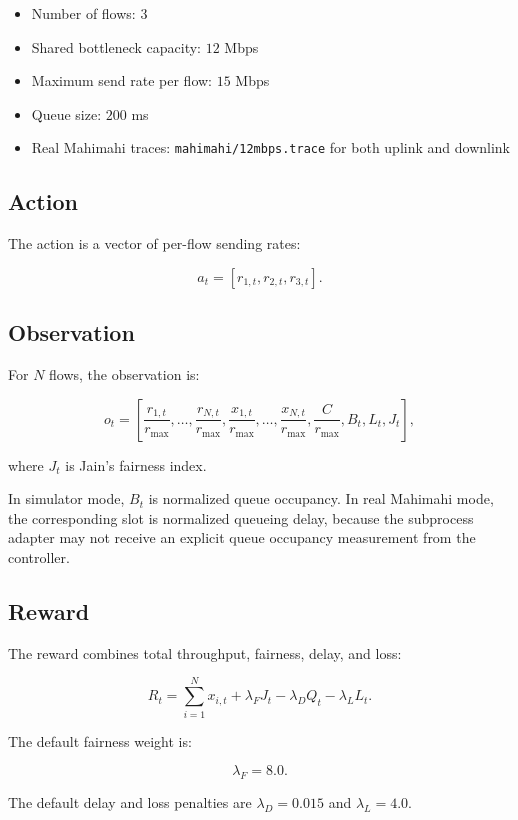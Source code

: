 \documentclass[11pt]{article}
\begin{document}
\begin{itemize}
  \item Number of flows: \(3\)
  \item Shared bottleneck capacity: \(12\) Mbps
  \item Maximum send rate per flow: \(15\) Mbps
  \item Queue size: \(200\) ms
  \item Real Mahimahi traces: \texttt{mahimahi/12mbps.trace} for both uplink
        and downlink
\end{itemize}

\subsection{Action}

The action is a vector of per-flow sending rates:

\[
a_t = [r_{1,t}, r_{2,t}, r_{3,t}].
\]

\subsection{Observation}

For \(N\) flows, the observation is:

\[
o_t =
\left[
\frac{r_{1,t}}{r_{\max}}, \ldots, \frac{r_{N,t}}{r_{\max}},
\frac{x_{1,t}}{r_{\max}}, \ldots, \frac{x_{N,t}}{r_{\max}},
\frac{C}{r_{\max}},
B_t,
L_t,
J_t
\right],
\]

where \(J_t\) is Jain's fairness index.

In simulator mode, \(B_t\) is normalized queue occupancy. In real Mahimahi
mode, the corresponding slot is normalized queueing delay, because the
subprocess adapter may not receive an explicit queue occupancy measurement from
the controller.

\subsection{Reward}

The reward combines total throughput, fairness, delay, and loss:

\[
R_t =
\sum_{i=1}^{N} x_{i,t}
+ \lambda_F J_t
- \lambda_D Q_t
- \lambda_L L_t.
\]

The default fairness weight is:

\[
\lambda_F = 8.0.
\]

The default delay and loss penalties are \(\lambda_D = 0.015\) and
\(\lambda_L = 4.0\).
\end{document}
